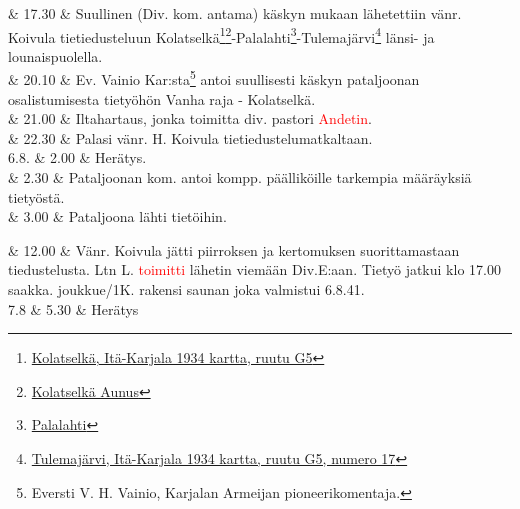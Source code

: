 \documentclass[11pt,a5paper,oneside]{book}
\begin{document}

& 17.30 & Suullinen (Div. kom. antama) käskyn mukaan lähetettiin vänr. Koivula tietiedusteluun Kolatselkä\footnote{\href{https://www.google.fi/maps/place/Kolatsel'ga,+Republic+of+Karelia,+Russia,+186148/}{Kolatselkä, Itä-Karjala 1934 kartta, ruutu G5}}\footnote{\href{https://www.sotahistoriallisetkohteet.fi/app/sights/view/-/id/1073/country/9/area/90/s_back/1}{Kolatselkä Aunus}}-Palalahti\footnote{\href{https://www.google.fi/maps/place/Palalakhta,+Republic+of+Karelia,+Russia,+186148/}{Palalahti}}-Tulemajärvi\footnote{\href{https://www.google.fi/maps/place/Ozero+Tulmozero/}{Tulemajärvi, Itä-Karjala 1934 kartta, ruutu G5, numero 17}} länsi- ja lounaispuolella. \newline \\

& 20.10 & Ev. Vainio Kar:sta\footnote{Eversti V. H. Vainio, Karjalan Armeijan pioneerikomentaja.} antoi suullisesti käskyn pataljoonan osalistumisesta tietyöhön Vanha raja - Kolatselkä. \\

& 21.00 & Iltahartaus, jonka toimitta div. pastori \textcolor{red}{Andetin}. \\

& 22.30 & Palasi vänr. H. Koivula tietiedustelumatkaltaan. \newline\newline\newline\newline\newline \\

6.8. & 2.00 & Herätys. \\

& 2.30 & Pataljoonan kom. antoi kompp. päälliköille tarkempia määräyksiä tietyöstä. \\

& 3.00 & Pataljoona lähti tietöihin. \\
\newpage

& 12.00 & Vänr. Koivula jätti piirroksen ja kertomuksen suorittamastaan tiedustelusta. Ltn L. \textcolor{red}{toimitti} lähetin viemään Div.E:aan. Tietyö jatkui klo 17.00 saakka.  joukkue/1K. rakensi saunan joka valmistui 6.8.41. \newline\newline \\

7.8 & 5.30 & Herätys \\
\end{document}
